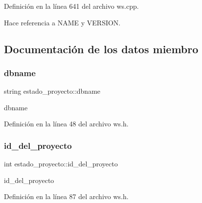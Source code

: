 Definición en la línea 641 del archivo ws.\+cpp.



Hace referencia a N\+A\+ME y V\+E\+R\+S\+I\+ON.



\subsection{Documentación de los datos miembro}
\hypertarget{classestado__proyecto_ad68c2876b60b2507510f01291b6a351e}{}\label{classestado__proyecto_ad68c2876b60b2507510f01291b6a351e} 
\subsubsection{\texorpdfstring{dbname}{dbname}}
{\footnotesize\ttfamily string estado\+\_\+proyecto\+::dbname}



dbname 



Definición en la línea 48 del archivo ws.\+h.

\hypertarget{classestado__proyecto_af82165bfe4a2b094605bed0955da6b46}{}\label{classestado__proyecto_af82165bfe4a2b094605bed0955da6b46} 
\subsubsection{\texorpdfstring{id\+\_\+del\+\_\+proyecto}{id\_del\_proyecto}}
{\footnotesize\ttfamily int estado\+\_\+proyecto\+::id\+\_\+del\+\_\+proyecto}



id\+\_\+del\+\_\+proyecto 



Definición en la línea 87 del archivo ws.\+h.

\hypertarget{classestado__proyecto_a1545134dd661b72333b06cfc9c11ae49}{}\label{classestado__proyecto_a1545134dd661b72333b06cfc9c11ae49} 
